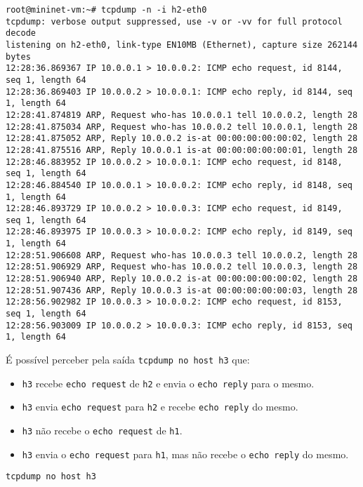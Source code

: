 \documentclass[12pt,letterpaper]{article}
\begin{document}
\begin{tiny}
\begin{verbatim}
root@mininet-vm:~# tcpdump -n -i h2-eth0
tcpdump: verbose output suppressed, use -v or -vv for full protocol decode
listening on h2-eth0, link-type EN10MB (Ethernet), capture size 262144 bytes
12:28:36.869367 IP 10.0.0.1 > 10.0.0.2: ICMP echo request, id 8144, seq 1, length 64
12:28:36.869403 IP 10.0.0.2 > 10.0.0.1: ICMP echo reply, id 8144, seq 1, length 64
12:28:41.874819 ARP, Request who-has 10.0.0.1 tell 10.0.0.2, length 28
12:28:41.875034 ARP, Request who-has 10.0.0.2 tell 10.0.0.1, length 28
12:28:41.875052 ARP, Reply 10.0.0.2 is-at 00:00:00:00:00:02, length 28
12:28:41.875516 ARP, Reply 10.0.0.1 is-at 00:00:00:00:00:01, length 28
12:28:46.883952 IP 10.0.0.2 > 10.0.0.1: ICMP echo request, id 8148, seq 1, length 64
12:28:46.884540 IP 10.0.0.1 > 10.0.0.2: ICMP echo reply, id 8148, seq 1, length 64
12:28:46.893729 IP 10.0.0.2 > 10.0.0.3: ICMP echo request, id 8149, seq 1, length 64
12:28:46.893975 IP 10.0.0.3 > 10.0.0.2: ICMP echo reply, id 8149, seq 1, length 64
12:28:51.906608 ARP, Request who-has 10.0.0.3 tell 10.0.0.2, length 28
12:28:51.906929 ARP, Request who-has 10.0.0.2 tell 10.0.0.3, length 28
12:28:51.906940 ARP, Reply 10.0.0.2 is-at 00:00:00:00:00:02, length 28
12:28:51.907436 ARP, Reply 10.0.0.3 is-at 00:00:00:00:00:03, length 28
12:28:56.902982 IP 10.0.0.3 > 10.0.0.2: ICMP echo request, id 8153, seq 1, length 64
12:28:56.903009 IP 10.0.0.2 > 10.0.0.3: ICMP echo reply, id 8153, seq 1, length 64
\end{verbatim}
\end{tiny}

É possível perceber pela saída \texttt{tcpdump no host h3} que:
\begin{itemize}
    \item \texttt{h3} recebe \texttt{echo request} de \texttt{h2} e envia o \texttt{echo reply} para o mesmo.
    \item \texttt{h3} envia \texttt{echo request} para \texttt{h2} e recebe \texttt{echo reply} do mesmo.
    \item \texttt{h3} não recebe o \texttt{echo request} de \texttt{h1}.
    \item \texttt{h3} envia o \texttt{echo request} para \texttt{h1}, mas não recebe o \texttt{echo reply} do mesmo. 
\end{itemize}

\begin{verbatim}
tcpdump no host h3
\end{verbatim}
\end{document}
